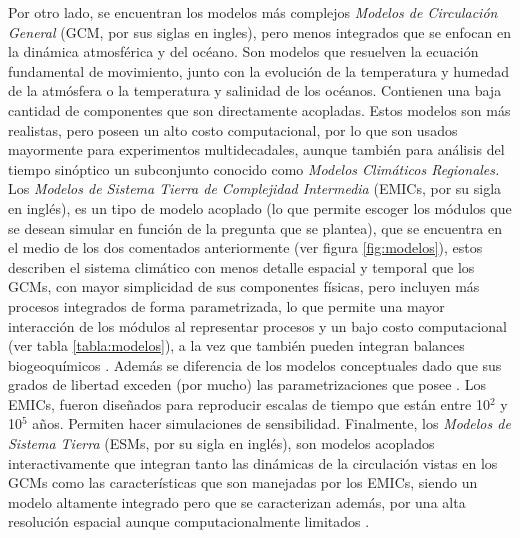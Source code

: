   Por otro lado, se encuentran los modelos más complejos \textit{Modelos de Circulación General} (GCM, por sus siglas en ingles), pero menos integrados que se enfocan en la dinámica atmosférica y del océano. Son modelos que resuelven la ecuación fundamental de movimiento, junto con la evolución de la temperatura y humedad de la atmósfera o la temperatura y salinidad de los océanos. Contienen una baja cantidad de componentes que son directamente acopladas. Estos modelos son más realistas, pero poseen un alto costo computacional, por lo que son usados mayormente para experimentos multidecadales, aunque tambi\'en para an\'alisis del tiempo sin\'optico un subconjunto conocido como \textit{Modelos Climáticos Regionales.} Los \textit{Modelos de Sistema Tierra de Complejidad Intermedia} (EMICs, por su sigla en inglés), es un tipo de modelo acoplado (lo que permite escoger los m\'odulos que se desean simular en funci\'on de la pregunta que se plantea), que se encuentra en el medio de los dos comentados anteriormente (ver figura \ref{fig:modelos}), estos describen el sistema climático con menos detalle espacial y temporal que los GCMs, con mayor simplicidad de sus componentes físicas, pero incluyen más procesos integrados de forma parametrizada, lo que permite una mayor interacción de los módulos al representar procesos y un bajo costo computacional (ver tabla \ref{tabla:modelos}), a la vez que tambi\'en pueden integran balances biogeoquímicos \citep{claussen2002earth,flato2011earth}. Además se diferencia de los modelos conceptuales dado que sus grados de libertad exceden (por mucho) las parametrizaciones que posee \citep{weber2010utility}. Los EMICs, fueron diseñados para reproducir escalas de tiempo que están entre 10$^2$ y 10$^5$ años. Permiten hacer simulaciones de sensibilidad. Finalmente, los \textit{Modelos de Sistema Tierra} (ESMs, por su sigla en ingl\'es), son modelos acoplados interactivamente que integran tanto las din\'amicas de la circulaci\'on vistas en los GCMs como las caracter\'isticas que son manejadas por los EMICs, siendo un modelo altamente integrado pero que se caracterizan adem\'as, por una alta resoluci\'on espacial aunque computacionalmente limitados \citep{bartlein2003modeling}. 


